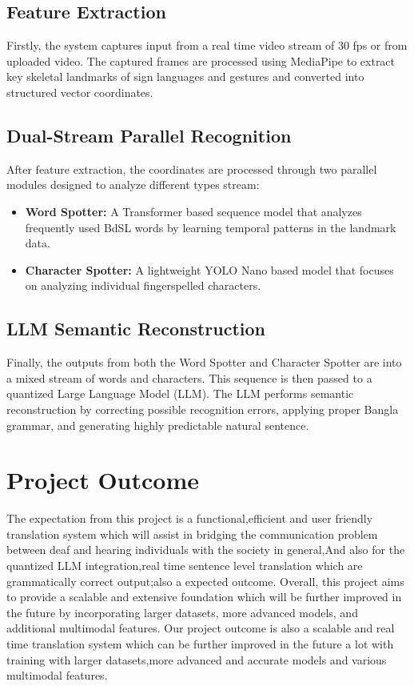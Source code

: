 \subsection{Feature Extraction}
Firstly, the system captures input from a real time video stream of 30 fps or from uploaded video. The captured frames are processed using MediaPipe to extract key skeletal landmarks of sign languages and gestures and converted into structured vector coordinates.

\subsection{Dual-Stream Parallel Recognition}
After feature extraction, the coordinates are processed through two parallel modules designed to analyze different types stream: 

\begin{itemize}
    \item \textbf{Word Spotter:} A Transformer based sequence model that analyzes frequently used BdSL words by learning temporal patterns in the landmark data.

    \item \textbf{Character Spotter:} A lightweight YOLO Nano based model that focuses on analyzing individual fingerspelled characters.
\end{itemize}

\subsection{LLM Semantic Reconstruction}
Finally, the outputs from both the Word Spotter and Character Spotter are  into a mixed stream of words and characters. This sequence is then passed to a quantized Large Language Model (LLM). The LLM performs semantic reconstruction by correcting possible recognition errors, applying proper Bangla grammar, and generating highly predictable natural sentence.

\section{Project Outcome}
The expectation from this project is a functional,efficient and user friendly translation system which will assist in bridging the communication problem between deaf and hearing individuals with the society in general,And also for the quantized LLM integration,real time sentence level translation which are grammatically correct output;also a expected outcome.
Overall, this project aims to provide a scalable and extensive foundation which will be further improved in the future by incorporating larger datasets, more advanced models, and additional multimodal features.
Our project outcome is also a scalable and real time translation system which can be further improved in the future a lot with training with larger datasets,more advanced and accurate models and various multimodal features.

